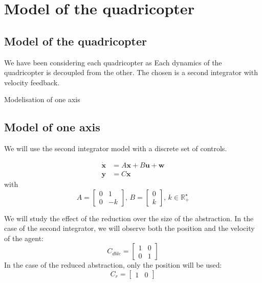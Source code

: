 \section{Model of the quadricopter}


\subsection{Model of the quadricopter}
We have been considering each quadricopter as 
Each dynamics of the quadricopter is decoupled from the other.
The chosen is a second integrator with velocity feedback. 

Modelisation of one axis

\subsection{Model of one axis}
We will use the second integrator model with a discrete set of controls.

\begin{equation}\label{eqn:lin_sys}
\begin{split}
\dot{\mathbf{x}} &= A \mathbf{x} + B \mathbf{u} + \mathbf{w}\\
\mathbf{y} &= C\mathbf{x}
\end{split}
\end{equation}
with
\begin{equation*} \label{eqn:sec_int}
A = \begin{bmatrix}
0 & 1\\ 
0 & -k
\end{bmatrix}
\textrm{, }
B = \begin{bmatrix}
0 \\ 
k 
\end{bmatrix}
\textrm{, }
k \in \mathbb{R}_+^\star
\end{equation*}

We will study the effect of the reduction over the size of the abstraction. In the case of the second integrator, we will observe both the position and the velocity of the agent:
\begin{equation}
C_{dble} = \begin{bmatrix}
1 & 0\\
0 & 1
\end{bmatrix}
\end{equation}
In the case of the reduced abstraction, only the position will be used:
\begin{equation}
 C_r = \begin{bmatrix}
 1 & 0
 \end{bmatrix}
\end{equation}

